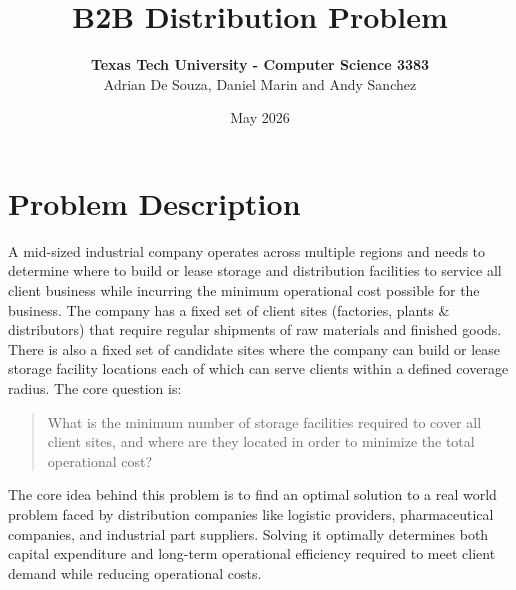 \documentclass[letterpaper]{article}
\title{\textbf{B2B Distribution Problem}}
\author{\textbf{Texas Tech University - Computer Science 3383}
    \\ Adrian De Souza, Daniel Marin and Andy Sanchez}
\date{May 2026}
\begin{document}
\maketitle 

\section{Problem Description}
A mid-sized industrial company operates across multiple regions and needs to determine where to build or lease storage and distribution facilities to service all client business while incurring the minimum operational cost possible for the business. The company has a fixed set of client sites (factories, plants \& distributors) that require regular shipments of raw materials and finished goods. There is also a fixed set of candidate sites where the company can build or lease storage facility locations each of which can serve clients within a defined coverage radius. The core question is: 

\begin{quote}
    What is the minimum number of storage facilities required to cover all client sites, and where are they located in order to minimize the total operational cost?
\end{quote}

The core idea behind this problem is to find an optimal solution to a real world problem faced by distribution companies like logistic providers, pharmaceutical companies, and industrial part suppliers. Solving it optimally determines both capital expenditure and long-term operational efficiency required to meet client demand while reducing operational costs. 
\end{document}
